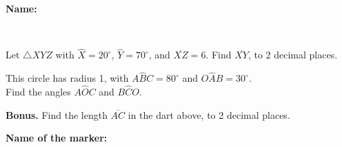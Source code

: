 \documentclass[12pt]{exam}
\begin{document}
\textbf{Name:} \dotfill

\
\begin{questions}


\question[6] Let $\triangle XYZ$ with $\hat{X} = 20^\circ$,  $\hat{Y} = 70^\circ$, and $\overline{XZ} = 6$. Find $\overline{XY}$, to 2 decimal places.
\fillwithdottedlines{58mm}

\question[4] This circle has radius 1, with $A\hat{B}C = 80^\circ$ and $O\hat{A}B = 30^\circ$. \\
Find the angles $A\hat{O}C$ and $B\hat{C}O$.

\vspace{-7mm}

\begin{minipage}{0.65\textwidth}
\vspace{3mm}
\fillwithdottedlines{50mm}
\end{minipage}
\begin{minipage}{0.3\textwidth}
\begin{center}



\end{center}
\end{minipage}

\question[0] \textbf{Bonus.} Find the length $\overline{AC}$ in the dart above, to 2 decimal places.


\end{questions}

\begin{tcolorbox}

\textbf{Name of the marker:}

\begin{center}
\gradetable[h][questions]
\end{center}

\end{tcolorbox}
\end{document}
